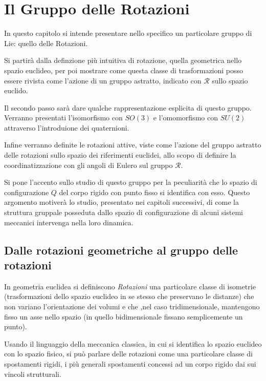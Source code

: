 \documentclass[11pt]{report}
\theoremstyle{plain}
\theoremstyle{definition}
\theoremstyle{remark}
\begin{document}
\clearpage
\chapter{Il Gruppo delle Rotazioni}

In questo capitolo si intende presentare nello specifico un particolare gruppo di Lie: quello delle Rotazioni.

Si partirà dalla definzione più intuitiva di rotazione, quella geometrica nello spazio euclideo, per poi mostrare come questa classe di trasformazioni posso essere rivista come l'azione di un gruppo astratto, indicato con $\mathscr{R}$ sullo spazio euclido.

Il secondo passo sarà dare qualche rappresentazione esplicita di questo gruppo. Verranno presentati l'isomorfismo con $SO(3)$ e l'omomorfismo con $SU(2)$ attraverso l'introduione dei quaternioni.

Infine verranno definite le rotazioni attive, viste come l'azione del gruppo astratto delle rotazioni sullo spazio dei riferimenti euclidei, allo scopo di definire la coordinatizzazione con gli angoli di Eulero sul gruppo $\mathscr{R}$.

Si pone l'accento sullo studio di questo gruppo per la peculiarità che lo spazio di configurazione $Q$ del corpo rigido con punto fisso si identifica con esso. Questo argomento motiverà lo studio, presentato nei capitoli successivi, di come la struttura gruppale posseduta dallo spazio di configurazione di alcuni sistemi meccanici intervenga nella loro dinamica.

\section{Dalle rotazioni geometriche al gruppo delle rotazioni}
In geometria euclidea si definiscono \emph{Rotazioni} una particolare classe di isometrie (trasformazioni dello spazio euclideo in se stesso che preservano le distanze) che non variano l'orientazione dei volumi e che  ,nel caso tridimensionale, mantengono fisso un asse nello spazio (in quello bidimensionale fissano semplicemente un punto).

Usando il linguaggio della meccanica classica, in cui si identifica lo spazio euclideo con lo spazio fisico, si può parlare delle rotazioni come una particolare classe di spostamenti rigidi, i più generali spostamenti concessi ad un corpo rigido dai sui vincoli strutturali.
\end{document}
